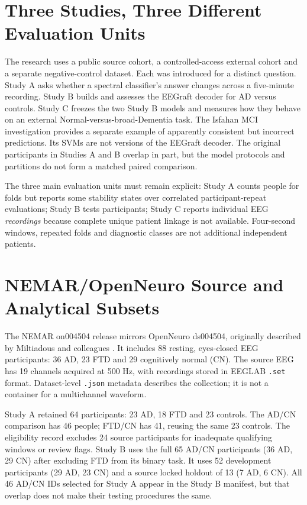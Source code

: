 \section{Three Studies, Three Different Evaluation Units}
The research uses a public source cohort, a controlled-access external cohort and a separate negative-control dataset. Each was introduced for a distinct question. Study A asks whether a spectral classifier's answer changes across a five-minute recording. Study B builds and assesses the EEGraft decoder for AD versus controls. Study C freezes the two Study B models and measures how they behave on an external Normal-versus-broad-Dementia task. The Isfahan MCI investigation provides a separate example of apparently consistent but incorrect predictions. Its SVMs are not versions of the EEGraft decoder. The original participants in Studies A and B overlap in part, but the model protocols and partitions do not form a matched paired comparison.

The three main evaluation units must remain explicit: Study A counts people for folds but reports some stability states over correlated participant-repeat evaluations; Study B tests participants; Study C reports individual EEG \emph{recordings} because complete unique patient linkage is not available. Four-second windows, repeated folds and diagnostic classes are not additional independent patients.

\section{NEMAR/OpenNeuro Source and Analytical Subsets}
The NEMAR on004504 release mirrors OpenNeuro ds004504, originally described by Miltiadous and colleagues \cite{miltiadous2023dataset,miltiadous2026dataset}. It includes 88 resting, eyes-closed EEG participants: 36 AD, 23 FTD and 29 cognitively normal (CN). The source EEG has 19 channels acquired at 500 Hz, with recordings stored in EEGLAB \texttt{.set} format. Dataset-level \texttt{.json} metadata describes the collection; it is not a container for a multichannel waveform.

Study A retained 64 participants: 23 AD, 18 FTD and 23 controls. The AD/CN comparison has 46 people; FTD/CN has 41, reusing the same 23 controls. The eligibility record excludes 24 source participants for inadequate qualifying windows or review flags. Study B uses the full 65 AD/CN participants (36 AD, 29 CN) after excluding FTD from its binary task. It uses 52 development participants (29 AD, 23 CN) and a source locked holdout of 13 (7 AD, 6 CN). All 46 AD/CN IDs selected for Study A appear in the Study B manifest, but that overlap does not make their testing procedures the same.

